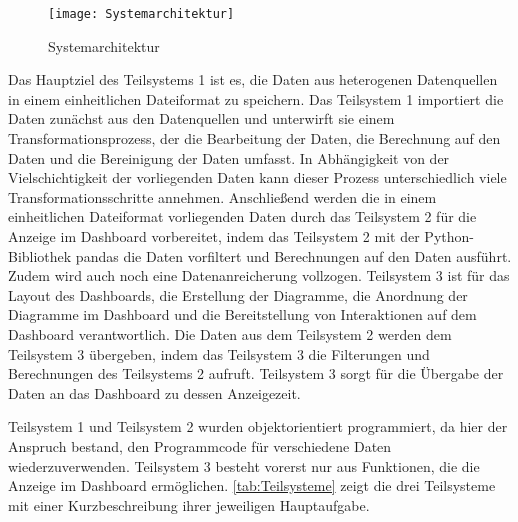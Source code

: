     \begin{figure}[H]
        \centering
            \texttt{[image: Systemarchitektur]}
            \caption{Systemarchitektur}
            \label{fig:Systemarchitektur}
    \end{figure}

    Das Hauptziel des Teilsystems 1 ist es, die Daten aus heterogenen Datenquellen in einem einheitlichen Dateiformat zu speichern.
    Das Teilsystem 1 importiert die Daten zunächst aus den Datenquellen und unterwirft sie einem Transformationsprozess, der die Bearbeitung der Daten, die Berechnung
    auf den Daten und die Bereinigung der Daten umfasst. In Abhängigkeit von der Vielschichtigkeit der vorliegenden Daten kann dieser Prozess unterschiedlich viele Transformationsschritte annehmen.  
    Anschließend werden die in einem einheitlichen Dateiformat vorliegenden Daten durch das Teilsystem 2 
    für die Anzeige im Dashboard vorbereitet, indem das Teilsystem 2 mit der Python-Bibliothek pandas die Daten vorfiltert und Berechnungen auf den Daten ausführt. 
    Zudem wird auch noch eine Datenanreicherung vollzogen. Teilsystem 3 ist für das Layout des Dashboards, die Erstellung der Diagramme, die Anordnung der Diagramme im Dashboard und 
    die Bereitstellung von Interaktionen auf dem Dashboard verantwortlich. Die Daten aus dem Teilsystem 2 werden dem Teilsystem 3 übergeben,
    indem das Teilsystem 3 die Filterungen und Berechnungen des Teilsystems 2 aufruft. Teilsystem 3 sorgt für die Übergabe der Daten an das Dashboard zu dessen Anzeigezeit.
    
    Teilsystem 1 und Teilsystem 2 wurden objektorientiert programmiert, da hier der Anspruch bestand, den Programmcode
    für verschiedene Daten wiederzuverwenden. Teilsystem 3 besteht vorerst nur aus Funktionen, die die Anzeige im Dashboard ermöglichen.
    \autoref{tab:Teilsysteme} zeigt die drei Teilsysteme mit einer Kurzbeschreibung ihrer jeweiligen Hauptaufgabe.

